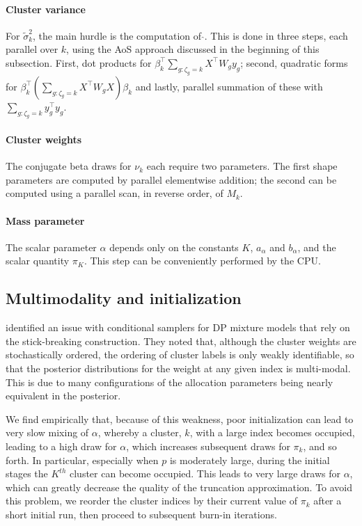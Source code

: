 \paragraph{Cluster variance}
For $\tilde{\sigma}^2_k$, the main hurdle is the computation of
$\hat{}$. This is done in three steps, each parallel over $k$, using
the AoS approach discussed in the beginning of this subsection. First,
dot products for $\beta_k^\top \sum_{g:\zeta_g=k}X^\top W_g y_g$;
second, quadratic forms for $\beta_k^\top\left( \sum_{g:\zeta_g=k}
  X^\top W_g X \right) \beta_k$ and lastly, parallel summation of
these with $\sum_{g:\zeta_g=k}y_g^\top y_g.$

\paragraph{Cluster weights}

The conjugate beta draws for $\nu_k$ each require two parameters. The
first shape parameters are computed by parallel elementwise addition;
the second can be computed using a parallel scan, in reverse order, of $M_k$.

\paragraph{Mass parameter}

The scalar parameter $\alpha$ depends only on the constants $K$, $a_\alpha$ and $b_\alpha$, and the scalar quantity $\pi_K$. This step can be conveniently performed by the CPU.



\subsection{Multimodality and initialization}
\label{subsec:initialization}
\citet{papas} identified an issue with conditional samplers for DP
mixture models that rely on the stick-breaking construction. They
noted that, although the cluster weights are stochastically
ordered, the ordering of cluster labels is only weakly identifiable,
so that the posterior distributions for the weight at any given index
is multi-modal. This is due to many configurations of the allocation
parameters being nearly equivalent in the posterior. 

We find empirically that, because of this weakness, poor initialization can
lead to very slow mixing of $\alpha$, whereby a cluster, $k$, with a large
index becomes occupied, leading to a high draw for $\alpha$, which
increases subsequent draws for $\pi_k$, and so forth. In particular,
especially when $p$ is moderately large, during the initial stages the
$K^{th}$ cluster can become occupied. This leads to very large draws
for $\alpha$, which can greatly decrease the quality of the truncation
approximation. To avoid this problem, we reorder the cluster indices by their current value of $\pi_k$ after a short initial run, then proceed to subsequent burn-in iterations. 

